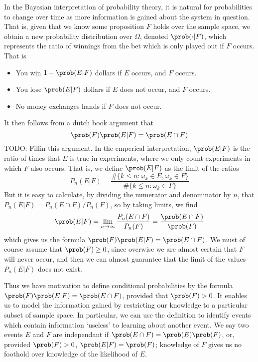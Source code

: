 In the Bayesian interpretation of probability theory, it is natural for probabilities to change over time as more information is gained about the system in question. That is, given that we know some proposition $F$ holds over the sample space, we obtain a new probability distribution over $\Omega$, denoted $\prob( \cdot | F)$, which represents the ratio of winnings from the bet which is only played out if $F$ occurs. That is
%
\begin{itemize}
    \item You win $1-\prob(E|F)$ dollars if $E$ occurs, and $F$ occurs.
    \item You lose $\prob(E|F)$ dollars if $E$ does not occur, and $F$ occurs.
    \item No money exchanges hands if $F$ does not occur.
\end{itemize}
%
It then follows from a dutch book argument that
%
\[ \prob(F) \prob(E | F) = \prob(E \cap F) \]
%
TODO: Fillin this argument. In the emperical interpretation, $\prob(E | F)$ is the ratio of times that $E$ is true in experiments, where we only count experiments in which $F$ also occurs. That is, we define $\prob(E | F)$ as the limit of the ratios
%
\[ P_n(E|F) = \frac{\# \{ k \leq n: \omega_k \in E, \omega_k \in F \}}{\# \{ k \leq n: \omega_k \in F \}} \]
%
But it is easy to calculate, by dividing the numerator and denominator by $n$, that $P_n(E|F) = P_n(E \cap F)/P_n(F)$, so by taking limits, we find
%
\[ \prob(E|F) = \lim_{n \to \infty} \frac{P_n(E \cap F)}{P_n(F)} = \frac{\prob(E \cap F)}{\prob(F)} \]
%
which gives us the formula $\prob(F) \prob(E | F) = \prob(E \cap F)$. We must of course assume that $\prob(F) \geq 0$, since overwise we are almost certain that $F$ will never occur, and then we can almost guarantee that the limit of the values $P_n(E|F)$ does not exist.

Thus we have motivation to define conditional probabilities by the formula $\prob(F) \prob(E|F) = \prob(E \cap F)$, provided that $\prob(F) > 0$. It enables us to model the information gained by restricting our knowledge to a particular subset of sample space. In particular, we can use the definition to identify events which contain information `useless' to learning about another event. We say two events $E$ and $F$ are independant if $\prob(E \cap F) = \prob(E) \prob(F)$, or, provided $\prob(F) > 0$, $\prob(E | F) = \prob(F)$; knowledge of $F$ gives us no foothold over knowledge of the likelihood of $E$.

